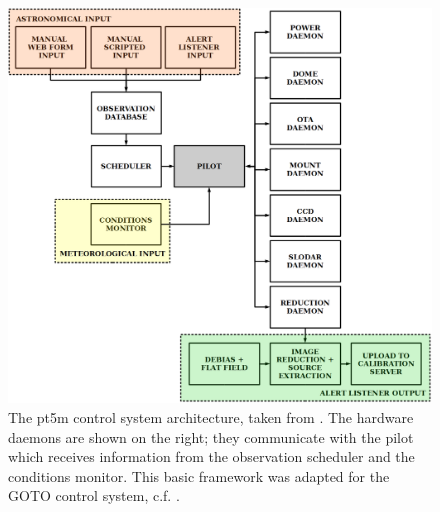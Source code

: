 \begin{colsection}
\begin{colsection}
\begin{figure}[p]
    \begin{center}
        \includegraphics[width=\linewidth]{images/pt5m_software.png}
    \end{center}
    \caption[The pt5m control system architecture]{
        The \gls{pt5m} control system architecture, taken from \citet{pt5m}. The hardware daemons are shown on the right; they communicate with the pilot which receives information from the observation scheduler and the conditions monitor. This basic framework was adapted for the GOTO control system, c.f. .
    }\label{fig:pt5m_software}
\end{figure}

\end{colsection}


\end{colsection}


\newpage

